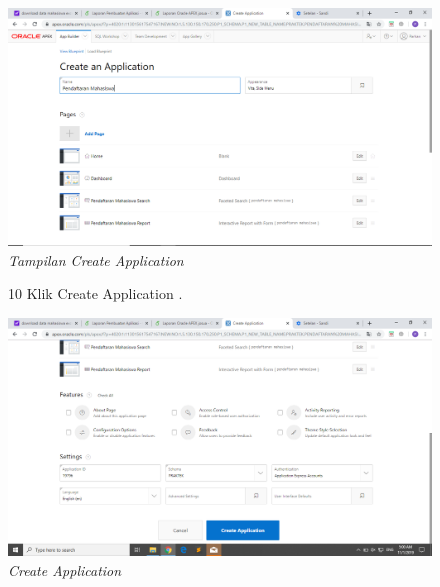 \begin{enumerate}
\begin{figure}
    \begin{center}
\includegraphics[scale=0.2]{figures/9.png}
    \caption{\textit{Tampilan Create Application}}
        \end{center}
\label{gambar}
\end{figure}

\begin{figure}
\item[10] Klik Create Application .

    \begin{center}
\includegraphics[scale=0.2]{figures/10.png}
    \caption{\textit{Create Application}}
        \end{center}
\label{gambar}
\end{figure}


\end{enumerate}
